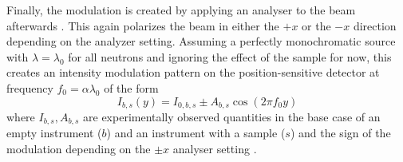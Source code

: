 \documentclass{article}
\begin{document}
Finally, the modulation is created by applying an analyser to the beam afterwards \cite{mezei1972}. This again polarizes the beam in either the $+x$ or the $-x$ direction depending on the analyzer setting. Assuming a perfectly monochromatic source with $\lambda = \lambda_0$ for all neutrons and ignoring the effect of the sample for now, this creates an intensity modulation pattern on the position-sensitive detector at frequency $f_0 = \alpha\lambda_0$ of the form
\begin{equation}
	I_{b,s}(y) = I_{0, b,s} \pm A_{b,s}\cos(2\pi f_0y) \label{eq:mono-modulation}
\end{equation}
where $I_{b,s}, A_{b,s}$ are experimentally observed quantities in the base case of an empty instrument ($b$) and an instrument with a sample ($s$) and the sign of the modulation depending on the $\pm x$ analyser setting \cite{parnell2023}. 
\end{document}
